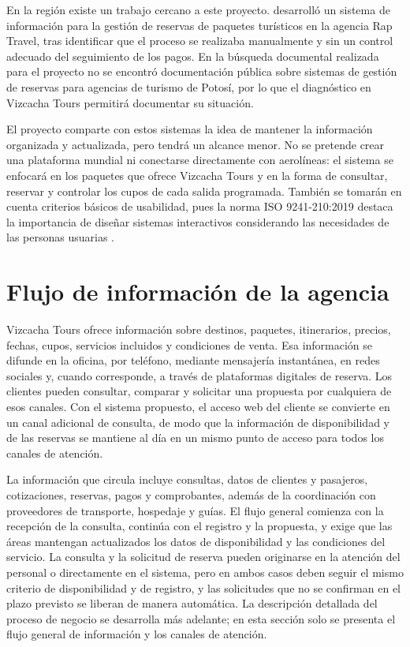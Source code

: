 En la región existe un trabajo cercano a este
proyecto. \textcite{huaman2017} desarrolló un sistema de información para la
gestión de reservas de paquetes turísticos en la agencia Rap Travel, tras
identificar que el proceso se realizaba manualmente y sin un control adecuado
del seguimiento de los pagos. En la búsqueda documental realizada para el
proyecto no se encontró documentación pública sobre sistemas de gestión de
reservas para agencias de turismo de Potosí, por lo que el diagnóstico en
Vizcacha Tours permitirá documentar su situación.

El proyecto comparte con estos sistemas la idea de mantener la información
organizada y actualizada, pero tendrá un alcance menor. No se pretende crear
una plataforma mundial ni conectarse directamente con aerolíneas: el sistema
se enfocará en los paquetes que ofrece Vizcacha Tours y en la forma de
consultar, reservar y controlar los cupos de cada salida programada. También
se tomarán en cuenta criterios básicos de usabilidad, pues la norma ISO
9241-210:2019 destaca la importancia de diseñar sistemas interactivos
considerando las necesidades de las personas usuarias \parencite{iso9241}.

\section*{Flujo de información de la agencia}

Vizcacha Tours ofrece información sobre destinos, paquetes, itinerarios,
precios, fechas, cupos, servicios incluidos y condiciones de venta. Esa
información se difunde en la oficina, por teléfono, mediante mensajería
instantánea, en redes sociales y, cuando corresponde, a través de plataformas
digitales de reserva. Los clientes pueden consultar, comparar y solicitar una
propuesta por cualquiera de esos canales. Con el sistema propuesto, el acceso
web del cliente se convierte en un canal adicional de consulta, de modo que la
información de disponibilidad y de las reservas se mantiene al día en un mismo
punto de acceso para todos los canales de atención.

La información que circula incluye consultas, datos de clientes y pasajeros,
cotizaciones, reservas, pagos y comprobantes, además de la coordinación con
proveedores de transporte, hospedaje y guías. El flujo general comienza con la
recepción de la consulta, continúa con el registro y la propuesta, y exige que
las áreas mantengan actualizados los datos de disponibilidad y las
condiciones del servicio. La consulta y la solicitud de reserva pueden
originarse en la atención del personal o directamente en el sistema, pero en
ambos casos deben seguir el mismo criterio de disponibilidad y de registro, y
las solicitudes que no se confirman en el plazo previsto se liberan de manera
automática. La descripción detallada del proceso de negocio se desarrolla más
adelante; en esta sección solo se presenta el flujo general de información y
los canales de atención.
